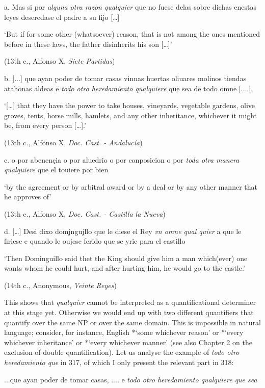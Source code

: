   a.  Mas si por \textit{alguna otra razon qualquier} que no fuese delas sobre dichas enestas leyes deseredase el padre a su fijo […]

    ‘But if for some other (whatsoever) reason, that is not among the ones mentioned before in these laws, the father disinherits his son […]’

    (13th c., Alfonso X, \textit{Siete Partidas})

  b.  [...] que ayan poder de tomar casas vinnas huertas oliuares molinos tiendas atahonas aldeas e \textit{todo otro heredamiento qualquiere} que sea de todo omne [....]. 

    ‘[…] that they have the power to take houses, vineyards, vegetable gardens, olive groves, tents, horse mills, hamlets, and any other inheritance, whichever it might be, from every person […].’

    (13th c., Alfonso X, \textit{Doc. Cast. - Andalucía})

  c.  o por abenençia o por aluedrio o por conposicion o por \textit{toda otra manera qualquiere} que el touiere por bien 

    ‘by the agreement or by arbitral award or by a deal or by any other manner that he approves of’

    (13th c., Alfonso X, \textit{Doc. Cast. - Castilla la Nueva})

  d.  […] Desi dixo domjngujllo que le diese el Rey \textit{vn omne qual quier} a que le firiese e quando le oujese ferido que se yrie para el castillo 

    ‘Then Dominguillo said thet the King should give him a man which(ever) one wants whom he could hurt, and after hurting him, he would go to the castle.’

    (14th c., Anonymous, \textit{Veinte Reyes})

This shows that \textit{qualquier} cannot be interpreted as a quantificational determiner at this stage yet. Otherwise we would end up with two different quantifiers that quantify over the same NP or over the same domain. This is impossible in natural language; consider, for instance, English *‘some whichever reason’ or *‘every whichever inheritance’ or *‘every whichever manner’ (see also Chapter 2 on the exclusion of double quantification). Let us analyse the example of \textit{todo otro heredamiento que} in 317, of which I only present the relevant part in 318:

  ...que ayan poder de tomar casas, .... e \textit{todo otro heredamiento qualquiere que sea}

